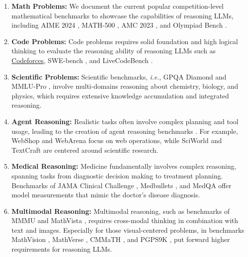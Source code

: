 \begin{enumerate}[itemindent=0em]
\item \textbf{Math Problems:} We document the current popular competition-level mathematical benchmarks to showcase the capabilities of reasoning LLMs, including AIME 2024 \cite{AIME2024}, MATH-500 \cite{lightmanlet}, AMC 2023 \cite{AMC2023}, and Olympiad Bench \cite{he2024olympiadbench}.

\item \textbf{Code Problems:} Code problems requires solid foundation and high logical thinking to evaluate the reasoning ability of reasoning LLMs such as \href{https://codeforces.com/}{Codeforces}, SWE-bench \cite{jimenez2024swebench}, and LiveCodeBench \cite{jain2024livecodebench}. 


\item \textbf{Scientific Problems:} Scientific benchmarks, \emph{i.e.}, GPQA Diamond \cite{rein2024gpqa} and MMLU-Pro \cite{wang2024mmlu}, involve multi-domains reasoning about chemistry, biology, and physics, which requires extensive knowledge accumulation and integrated reasoning. 

\item \textbf{Agent Reasoning:} Realistic tasks often involve complex planning and tool usage, leading to the creation of agent reasoning benchmarks \cite{xi2024agentgym}. For example, WebShop \cite{yao2022webshop} and WebArena \cite{zhou2023webarena} focus on web operations, while SciWorld \cite{scienceworld2022} and TextCraft \cite{prasad2024adapt} are centered around scientific research.

\item \textbf{Medical Reasoning:} Medicine fundamentally involves complex reasoning, spanning tasks from diagnostic decision making to treatment planning. Benchmarks of JAMA Clinical Challenge \cite{chen2024benchmarking}, Medbullets \cite{chen2024benchmarking}, and MedQA \cite{jin2021disease} offer model measurements that mimic the doctor's disease diagnosis. 

\item \textbf{Multimodal Reasoning:} Multimodal reasoning, such as benchmarks of MMMU \cite{yue2024mmmu} and MathVista \cite{lu2024mathvista}, requires cross-modal thinking in combination with text and images. 
Especially for those visual-centered problems, in benchmarks MathVision \cite{MathVision}, MathVerse \cite{zhang2024mathverse}, CMMaTH \cite{li2024cmmath}, and PGPS9K \cite{Zhang2023PGPS}, put forward higher requirements for reasoning LLMs.


\end{enumerate}




